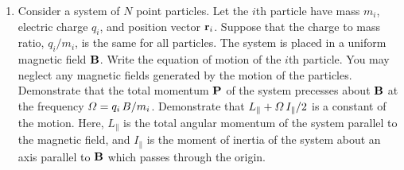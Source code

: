 {\begin{enumerate}
\item Consider a system of $N$ point particles. Let the $i$th particle have mass $m_i$, electric
 charge $q_i$, and position vector ${\bf r}_i$. Suppose that the charge to
 mass ratio, $q_i/m_i$, is the same for all particles. The system is placed
 in a uniform magnetic field ${\bf B}$. Write the equation
 of motion of the $i$th particle. You may neglect any magnetic fields generated by the motion of the particles. Demonstrate that the total momentum
 ${\bf P}$ of the system precesses  about ${\bf B}$ at the frequency
 ${\mit\Omega} = q_i\,B/m_i$. Demonstrate that $L_\parallel + {\mit\Omega}\,I_\parallel/2$ is a constant of the motion. Here, $L_\parallel$
 is the total angular momentum of the system parallel to the magnetic
 field, and $I_\parallel$ is the moment of inertia of the system about
 an axis parallel to ${\bf B}$ which passes through the origin.
\end{enumerate}
}


